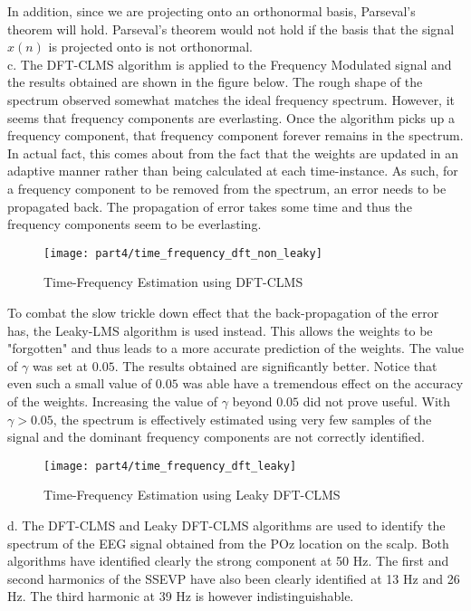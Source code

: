 \noindent{}In addition, since we are projecting onto an orthonormal basis, Parseval's theorem will hold. Parseval's theorem would not hold if the basis that the signal $x(n)$ is projected onto is not orthonormal.\\

\noindent{}c. The DFT-CLMS algorithm is applied to the Frequency Modulated signal and the results obtained are shown in the figure below. The rough shape of the spectrum observed somewhat matches the ideal frequency spectrum. However, it seems that frequency components are everlasting. Once the algorithm picks up a frequency component, that frequency component forever remains in the spectrum. In actual fact, this comes about from the fact that the weights are updated in an adaptive manner rather than being calculated at each time-instance. As such, for a frequency component to be removed from the spectrum, an error needs to be propagated back. The propagation of error takes some time and thus the frequency components seem to be everlasting.
 
\begin{figure}[H]
\centering{}
\texttt{[image: part4/time\_frequency\_dft\_non\_leaky]}
\caption{Time-Frequency Estimation using DFT-CLMS}
\end{figure}

\noindent{}To combat the slow trickle down effect that the back-propagation of the error has, the Leaky-LMS algorithm is used instead. This allows the weights to be "forgotten" and thus leads to a more accurate prediction of the weights. The value of $\gamma$ was set at $0.05$. The results obtained are significantly better. Notice that even such a small value of $0.05$ was able have a tremendous effect on the accuracy of the weights. Increasing the value of $\gamma$ beyond $0.05$ did not prove useful. With $\gamma>0.05$, the spectrum is effectively estimated using very few samples of the signal and the dominant frequency components are not correctly identified. 

\begin{figure}[H]
\centering{}
\texttt{[image: part4/time\_frequency\_dft\_leaky]}
\caption{Time-Frequency Estimation using Leaky DFT-CLMS}
\end{figure}

\noindent{}d. The DFT-CLMS and Leaky DFT-CLMS algorithms are used to identify the spectrum of the EEG signal obtained from the POz location on the scalp. Both algorithms have identified clearly the strong component at 50 Hz. The first and second harmonics of the SSEVP have also been clearly identified at 13 Hz and 26 Hz. The third harmonic at 39 Hz is however indistinguishable. \\

